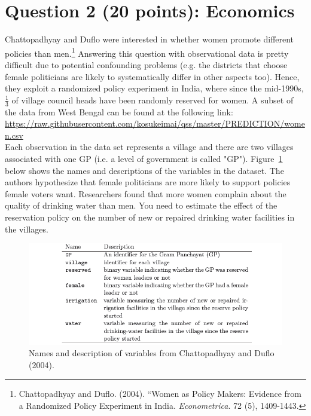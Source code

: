 \documentclass[12pt,letterpaper]{article}
\begin{document}
\section*{Question 2 (20 points): Economics}
Chattopadhyay and Duflo were interested in whether women promote different policies than men.\footnote{Chattopadhyay and Duflo. (2004). ``Women as Policy Makers: Evidence from a Randomized Policy Experiment in India. \textit{Econometrica}. 72 (5), 1409-1443.} Answering this question with observational data is pretty difficult due to potential confounding problems (e.g. the districts that choose female politicians are likely to systematically differ in other aspects too). Hence, they exploit a randomized policy experiment in India, where since the mid-1990s, $\frac{1}{3}$ of village council heads have been randomly reserved for women. A subset of the data from West Bengal can be found at the following link: \url{https://raw.githubusercontent.com/kosukeimai/qss/master/PREDICTION/women.csv}\\

\noindent Each observation in the data set represents a village and there are two villages associated with one GP (i.e. a level of government is called "GP"). Figure~\ref{fig:women_desc} below shows the names and descriptions of the variables in the dataset. The authors hypothesize that female politicians are more likely to support policies female voters want. Researchers found that more women complain about the quality of drinking water than men. You need to estimate the effect of the reservation policy on the number of new or repaired drinking water facilities in the villages.
\vspace{.5cm}

\begin{figure}[h!]
	\caption{\footnotesize{Names and description of variables from Chattopadhyay and Duflo (2004).}}
	\vspace{.5cm}
	\centering
	\label{fig:women_desc}
	\includegraphics[width=1.1\textwidth]{women_desc.png}
\end{figure}		
\end{document}

